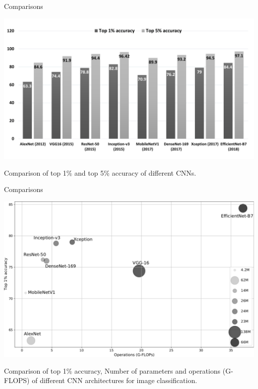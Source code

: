 \documentclass{beamer}
\begin{document}
\begin{frame}{Comparisons}

\begin{center}
    \includegraphics[scale=0.3]{Module 4 (CNN)/pics/accuracy.pdf}

{Comparison of top 1\% and top 5\% accuracy of different CNNs.}
\end{center}


    
\end{frame}
\begin{frame}{Comparisons}
\begin{center}
\vspace{-0.7cm}
\includegraphics[scale=0.3]{Module 4 (CNN)/pics/gflop_acc_param_CNNnets.pdf}
\end{center}
Comparison of top 1\% accuracy, Number of parameters and operations (G-FLOPS) of different CNN architectures for image classification.

    
\end{frame}
\end{document}
